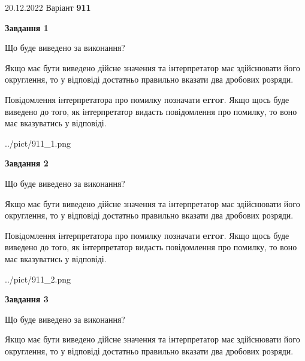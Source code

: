 \documentclass[12pt, ukrainian]{article}
\begin{document}
{20.12.2022 Варіант \No \textbf { 911 }\par}
{
\begin {Large}

{\begin {center}\textbf{Завдання 1}\end {center}}\par
Що буде виведено за виконання? \par

Якщо має бути виведено дійсне значення та інтерпретатор має здійснювати його округлення, 
то у відповіді достатньо правильно вказати два дробових розряди.

Повідомлення інтерпретатора про помилку позначати \textbf{error}.
Якщо щось буде виведено до того, як інтерпретатор видасть повідомлення про помилку, 
то воно має вказуватись у відповіді. \par

\begin{center}
	{../pict/911_1.png}
\end{center}
\newpage

{\begin {center}\textbf{Завдання 2}\end {center}}\par
Що буде виведено за виконання? \par

Якщо має бути виведено дійсне значення та інтерпретатор має здійснювати його округлення, 
то у відповіді достатньо правильно вказати два дробових розряди.

Повідомлення інтерпретатора про помилку позначати \textbf{error}.
Якщо щось буде виведено до того, як інтерпретатор видасть повідомлення про помилку, 
то воно має вказуватись у відповіді. \par

\begin{center}
	{../pict/911_2.png}
\end{center}
\newpage

{\begin {center}\textbf{Завдання 3}\end {center}}\par
Що буде виведено за виконання? \par

Якщо має бути виведено дійсне значення та інтерпретатор має здійснювати його округлення, 
то у відповіді достатньо правильно вказати два дробових розряди.


\end{Large}}
\end{document}
